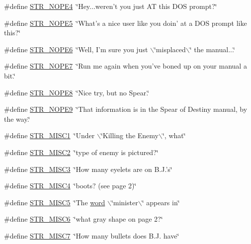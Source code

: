 \begin{DoxyCompactItemize}
\#define \hyperlink{F__SPEAR_8H_a4e28ab0db4d5ac3034cd12a5c1c5be24}{STR\_\-NOPE4}~\char`\"{}Hey...weren't you just AT this DOS prompt?\char`\"{}
\item 
\#define \hyperlink{F__SPEAR_8H_a423da0470a73eb65085ea2f07f3bfd01}{STR\_\-NOPE5}~\char`\"{}What's a nice user like you doin' at a DOS prompt like this?\char`\"{}
\item 
\#define \hyperlink{F__SPEAR_8H_a72513a15d6c56dabf174f0b87bc380c7}{STR\_\-NOPE6}~\char`\"{}Well, I'm sure you just $\backslash$\char`\"{}misplaced$\backslash$\char`\"{} the manual...\char`\"{}
\item 
\#define \hyperlink{F__SPEAR_8H_a50f945542e840e45fb5dcff0fc689a1c}{STR\_\-NOPE7}~\char`\"{}Run me again when you've boned up on your manual a bit.\char`\"{}
\item 
\#define \hyperlink{F__SPEAR_8H_aac118b9dda85e6d7861f36ecba8a4f43}{STR\_\-NOPE8}~\char`\"{}Nice try, but no Spear.\char`\"{}
\item 
\#define \hyperlink{F__SPEAR_8H_ac5929463ce90020d782375e78474de84}{STR\_\-NOPE9}~\char`\"{}That information is in the Spear of Destiny manual, by the way.\char`\"{}
\item 
\#define \hyperlink{F__SPEAR_8H_aa662dd23314b8fb854b40b2b23c67b2c}{STR\_\-MISC1}~\char`\"{}Under $\backslash$\char`\"{}Killing the Enemy$\backslash$\char`\"{}, what\char`\"{}
\item 
\#define \hyperlink{F__SPEAR_8H_a4fddac0a654c22da0cdacc25f0d34027}{STR\_\-MISC2}~\char`\"{}type of enemy is pictured?\char`\"{}
\item 
\#define \hyperlink{F__SPEAR_8H_a22b349dcf704eb20029419338278215e}{STR\_\-MISC3}~\char`\"{}How many eyelets are on B.J.'s\char`\"{}
\item 
\#define \hyperlink{F__SPEAR_8H_ac7a6a6a0159f2e51607388241d33dbb4}{STR\_\-MISC4}~\char`\"{}boots? (see page 2)\char`\"{}
\item 
\#define \hyperlink{F__SPEAR_8H_a7a88e83ae39ebc60b917249d816a4485}{STR\_\-MISC5}~\char`\"{}The \hyperlink{ID__HEAD_8H_abad51e07ab6d26bec9f1f786c8d65bcd}{word} $\backslash$\char`\"{}minister$\backslash$\char`\"{} appears in\char`\"{}
\item 
\#define \hyperlink{F__SPEAR_8H_af83844b6869c692c98993da5523494c4}{STR\_\-MISC6}~\char`\"{}what gray shape on page 2?\char`\"{}
\item 
\#define \hyperlink{F__SPEAR_8H_a90b0445bc75514c683c6809eae789bde}{STR\_\-MISC7}~\char`\"{}How many bullets does B.J. have\char`\"{}
\item 

\end{DoxyCompactItemize}
